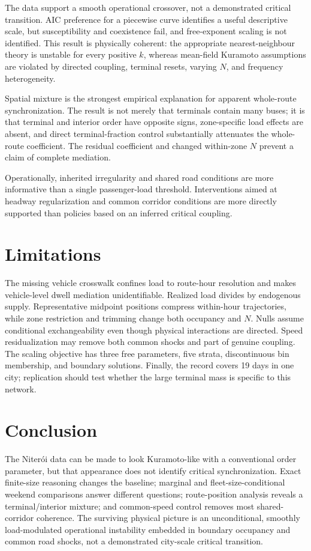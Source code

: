 \documentclass[9pt,twocolumn,twoside]{opticajnl}
\begin{document}
The data support a smooth operational crossover, not a demonstrated critical transition.  AIC
preference for a piecewise curve identifies a useful descriptive scale, but susceptibility and
coexistence fail, and free-exponent scaling is not identified.  This result is physically coherent:
the appropriate nearest-neighbour theory is unstable for every positive $k$, whereas mean-field
Kuramoto assumptions are violated by directed coupling, terminal resets, varying $N$, and frequency
heterogeneity.

Spatial mixture is the strongest empirical explanation for apparent whole-route synchronization.
The result is not merely that terminals contain many buses; it is that terminal and interior order
have opposite signs, zone-specific load effects are absent, and direct terminal-fraction control
substantially attenuates the whole-route coefficient.  The residual coefficient and changed
within-zone $N$ prevent a claim of complete mediation.

Operationally, inherited irregularity and shared road conditions are more informative than a
single passenger-load threshold.  Interventions aimed at headway regularization and common corridor
conditions are more directly supported than policies based on an inferred critical coupling.

\section{Limitations}

The missing vehicle crosswalk confines load to route-hour resolution and makes vehicle-level dwell
mediation unidentifiable.  Realized load divides by endogenous supply.  Representative midpoint
positions compress within-hour trajectories, while zone restriction and trimming change both
occupancy and $N$.  Nulls assume conditional exchangeability even though physical interactions are
directed.  Speed residualization may remove both common shocks and part of genuine coupling.  The
scaling objective has three free parameters, five strata, discontinuous bin membership, and boundary
solutions.  Finally, the record covers 19 days in one city; replication should test whether the
large terminal mass is specific to this network.

\section{Conclusion}

The Niter\'oi data can be made to look Kuramoto-like with a conventional order parameter, but that
appearance does not identify critical synchronization.  Exact finite-size reasoning changes the
baseline; marginal and fleet-size-conditional weekend comparisons answer different questions;
route-position analysis reveals a terminal/interior mixture; and common-speed control removes most
shared-corridor coherence.  The surviving physical picture is an unconditional, smoothly
load-modulated operational instability embedded in boundary occupancy and common road shocks, not
a demonstrated city-scale critical transition.
\end{document}
